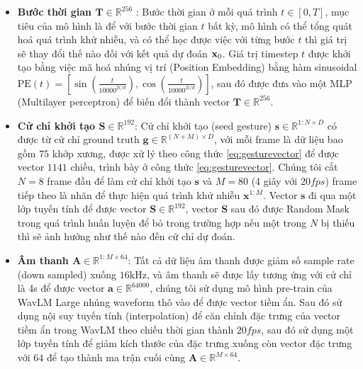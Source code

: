 \begin{itemize}
	\item \textbf{Bước thời gian $\mathbf{T} \in \mathbb{R}^{256}$ }: Bước thời gian ở mỗi quá trình $t \in [0, T]$, mục tiêu của mô hình là để với bước thời gian $t$ bất kỳ, mô hình có thể tổng quát hoá quá trình khử nhiễu, và có thể học được việc với từng bước $t$ thì giá trị sẽ thay đổi thế nào đối với kết quả dự đoán $\mathbf{x}_0$. Giá trị timestep $t$ được khởi tạo bằng việc mã hoá nhúng vị trí (Position Embedding) bằng hàm sinusoidal $\text{PE}(t) = \left[ \sin{\left(\frac{t}{10000^{2i / d}}\right)}, \cos{\left(\frac{t}{10000^{2i / d}}\right)} \right]$, sau đó được đưa vào một MLP (Multilayer perceptron) để biến đổi thành vector $\mathbf{T}  \in \mathbb{R}^{256}$.
	
	\item \textbf{Cử chỉ khởi tạo $\mathbf{S} \in \mathbb{R}^{192}$}: Cử chỉ khởi tạo (seed gesture) $\mathbf{s} \in \mathbb{R}^{1:N \times D}$ có được từ cử chỉ ground truth $
	\mathbf{g} \in \mathbb{R}^{(N+M) \times D}$, với mỗi frame là dữ liệu bao gồm $75$ khớp xương, được xử lý theo công thức \ref{eq:gesturevector} để được vector $1141$ chiều, trình bày ở công thức \ref{eq:gesturevector}. Chúng tôi cắt $N = 8$ frame đầu để làm cử chỉ khởi tạo $\mathbf{s}$ và $M = 80$ (4 giây với $20fps$) frame tiếp theo là nhãn để thực hiện quá trình khử nhiễu $\mathbf{x}^{1:M}$. Vector $\mathbf{s}$ đi qua một lớp tuyến tính để được vector $\mathbf{S} \in \mathbb{R}^{192}$, vector $\mathbf{S}$ sau đó được Random Mask trong quá trình huấn luyện để bỏ trong trường hợp nếu một trong $N$ bị thiếu thì sẽ ảnh hưởng như thế nào đến cử chỉ dự đoán.
	
  \item \textbf{Âm thanh $\mathbf{A} \in \mathbb{R}^{1:M \times 64}$}: Tất cả dữ liệu âm thanh được giảm số sample rate (down sampled) xuống $16 \mathrm{kHz}$, và âm thanh sẽ được lấy tương ứng với cử chỉ là 4s để được vector $\mathbf{a} \in \mathbb{R}^{64000}$, chúng tôi sử dụng mô hình pre-train của WavLM Large \cite{Chen_2022} nhúng waveform thô vào  để được vector tiềm ẩn. Sau đó sử dụng nội suy tuyến tính (interpolation) để căn chỉnh đặc trưng của vector tiềm ẩn trong WavLM theo chiều thời gian thành $20fps$, sau đó sử dụng một lớp tuyến tính để giảm kích thước của đặc trưng xuống còn vector đặc trưng với $64$ để tạo thành ma trận cuối cùng $\mathbf{A} \in \mathbb{R}^{M \times 64}$.
		

\end{itemize}
